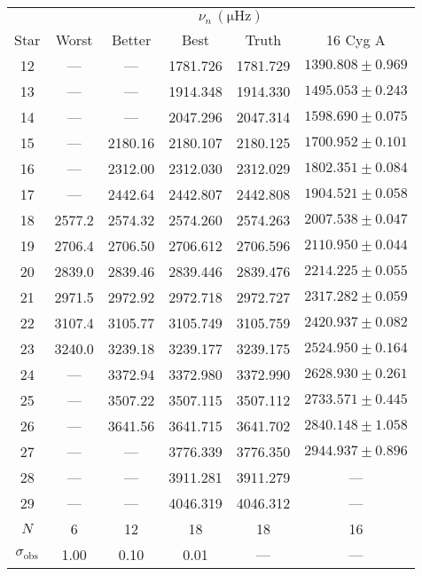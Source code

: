 \begin{tabular}{c|cccc|c}
\toprule
 & \multicolumn{5}{c}{$\nu_n \, (\mathrm{\mu Hz})$} \\
Star & Worst & Better & Best & Truth & 16 Cyg A \\
\midrule
12 & --- & --- & 1781.726 & 1781.729 & $1390.808 \pm 0.969$ \\
13 & --- & --- & 1914.348 & 1914.330 & $1495.053 \pm 0.243$ \\
14 & --- & --- & 2047.296 & 2047.314 & $1598.690 \pm 0.075$ \\
15 & --- & 2180.16 & 2180.107 & 2180.125 & $1700.952 \pm 0.101$ \\
16 & --- & 2312.00 & 2312.030 & 2312.029 & $1802.351 \pm 0.084$ \\
17 & --- & 2442.64 & 2442.807 & 2442.808 & $1904.521 \pm 0.058$ \\
18 & 2577.2 & 2574.32 & 2574.260 & 2574.263 & $2007.538 \pm 0.047$ \\
19 & 2706.4 & 2706.50 & 2706.612 & 2706.596 & $2110.950 \pm 0.044$ \\
20 & 2839.0 & 2839.46 & 2839.446 & 2839.476 & $2214.225 \pm 0.055$ \\
21 & 2971.5 & 2972.92 & 2972.718 & 2972.727 & $2317.282 \pm 0.059$ \\
22 & 3107.4 & 3105.77 & 3105.749 & 3105.759 & $2420.937 \pm 0.082$ \\
23 & 3240.0 & 3239.18 & 3239.177 & 3239.175 & $2524.950 \pm 0.164$ \\
24 & --- & 3372.94 & 3372.980 & 3372.990 & $2628.930 \pm 0.261$ \\
25 & --- & 3507.22 & 3507.115 & 3507.112 & $2733.571 \pm 0.445$ \\
26 & --- & 3641.56 & 3641.715 & 3641.702 & $2840.148 \pm 1.058$ \\
27 & --- & --- & 3776.339 & 3776.350 & $2944.937 \pm 0.896$ \\
28 & --- & --- & 3911.281 & 3911.279 & --- \\
29 & --- & --- & 4046.319 & 4046.312 & --- \\
\midrule%
$N$ & 6 & 12 & 18 & 18 & 16 \\
$\sigma_\mathrm{obs}$ & 1.00 & 0.10 & 0.01 & --- & --- \\
\bottomrule
\end{tabular}

